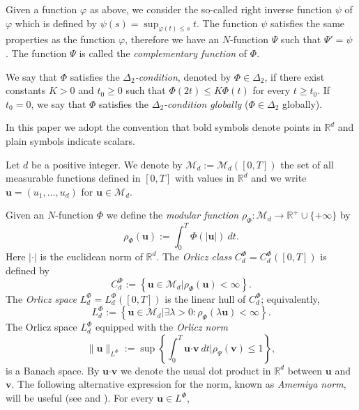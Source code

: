 \documentclass[twoside]{article}
\theoremstyle{remark}
\newcommand{\orlnor}{\|_{L^{\Phi}}}
\newcommand{\lphi}{L^{\Phi}}
\newcommand{\claseor}{C^{\Phi}}
\renewcommand{\b}[1]{\boldsymbol{#1}}
\renewcommand{\leq}{\leqslant}
\begin{document}
Given a function $\varphi$ as above, we  consider the so-called right inverse function $\psi$ of $\varphi$ which is 
defined by $\psi(s)=\sup_{\varphi(t)\leq s}t$.
The function $\psi$ satisfies the same properties as the function $\varphi$, therefore we have an $N$-function $\Psi$ such that $\Psi'=\psi$ .
 The function $\Psi$ is called the \emph{complementary function} of $\Phi$.


We say that $\Phi$ satisfies the  \emph{$\Delta_2$-condition}, denoted by $\Phi \in \Delta_2$, 
if there exist  constants $K>0$ and  $t_0\geq 0$ such that $\Phi(2t)\leq K\Phi(t)$
for every $t\geq t_0$. 
If $t_0=0$,  we say that $\Phi$ satisfies the \emph{$\Delta_2$-condition globally} ($\Phi \in \Delta_2$ globally).  

 In this paper we adopt the convention that bold symbols denote points in $\mathbb{R}^d$ and plain symbols indicate scalars.

Let $d$ be a positive integer. We denote by $\mathcal{M}_d:=\mathcal{M}_d([0,T])$ the set of all measurable functions defined in $[0,T]$ with values in $\mathbb{R}^d$ and  we write $\b{u}=(u_1,\dots,u_d)$ for  $\b{u}\in \mathcal{M}_d$.


Given  an $N$-function $\Phi$ we define the \emph{modular function} 
$\rho_{\Phi}:\mathcal{M}_d\to \mathbb{R}^+\cup\{+\infty\}$ by
\[\rho_{\Phi}(\b{u}):= \int_0^T \Phi(|\b{u}|)\ dt.\]
Here $|\cdot|$ is the euclidean norm of $\mathbb{R}^d$.
The \emph{Orlicz class} $C_d^{\Phi}=C_d^{\Phi}([0,T])$  is defined by
\begin{equation}\label{claseOrlicz}
  C^{\Phi}_d:=\left\{\b{u}\in \mathcal{M}_d | \rho_{\Phi}(\b{u})< \infty \right\}.
\end{equation}
The \emph{Orlicz space} $\lphi_d=L^{\Phi}_d([0,T])$ is the linear hull of $\claseor_d$;
equivalently,
\begin{equation}\label{espacioOrlicz}
\lphi_d:=\left\{ \b{u}\in \mathcal{M}_d | \exists \lambda>0: \rho_{\Phi}(\lambda \b{u}) < \infty   \right\}.
\end{equation}
  The Orlicz space $\lphi_d$ equipped with the \emph{Orlicz norm}
\[
\|  \b{u}  \orlnor:=\sup \left\{  \int_0^T \b{u}\b{\cdot} \b{v}\ dt \big| \rho_{\Psi}(\b{v})\leq 1\right\},
\]
is a Banach space. By $\b{u}\b{\cdot} \b{v}$ we denote the usual dot product in $\mathbb{R}^{d}$ between $\b{u}$ and $\b{v}$.  
The following alternative expression for the norm, known as \emph{Amemiya norm},     will  be useful (see \cite[Thm. 10.5]{KR} and \cite{hudzik2000amemiya}). For every $\b{u}\in\lphi$,
\end{document}
